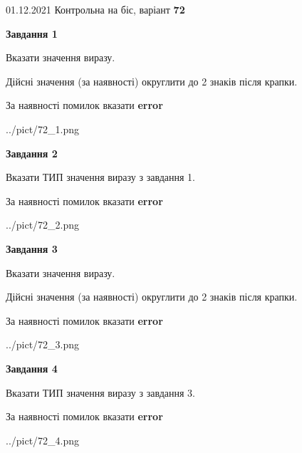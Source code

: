 \documentclass[11pt, ukrainian]{article}
\begin{document}
{01.12.2021 Контрольна на біс, варіант  \No \textbf { 72 }\par}
{
\begin {large}
{\begin {center}\textbf{Завдання 1}\end {center}}\par
Вказати значення виразу. \par
Дійсні значення (за наявності) округлити до 2 знаків після крапки. \par
За наявності помилок вказати \textbf{error}

\begin{center}
	{../pict/72_1.png}
\end{center}
\newpage

{\begin {center}\textbf{Завдання 2}\end {center}}\par
Вказати ТИП значення виразу з завдання 1. \par
За наявності помилок вказати \textbf{error}

\begin{center}
	{../pict/72_2.png}
\end{center}
\newpage

{\begin {center}\textbf{Завдання 3}\end {center}}\par
Вказати значення виразу. \par
Дійсні значення (за наявності) округлити до 2 знаків після крапки. \par
За наявності помилок вказати \textbf{error}

\begin{center}
	{../pict/72_3.png}
\end{center}
\newpage

{\begin {center}\textbf{Завдання 4}\end {center}}\par
Вказати ТИП значення виразу з завдання 3. \par
За наявності помилок вказати \textbf{error}

\begin{center}
	{../pict/72_4.png}
\end{center}
\newpage


\end{large}}
\end{document}
